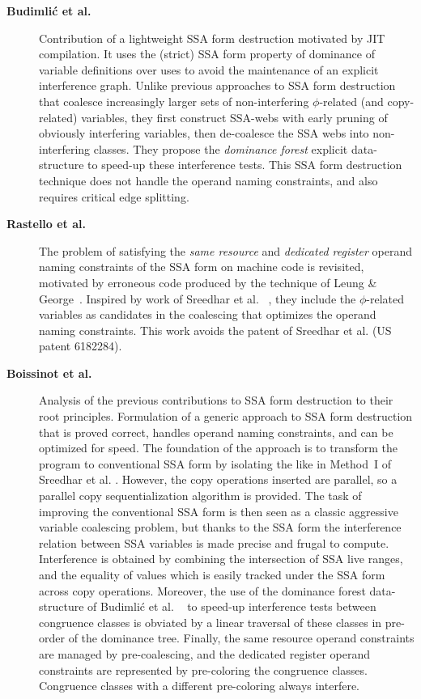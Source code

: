 \begin{description}
\item[\textbf{Budimli\'c et al.~\cite{Budimlic:2002:PLDI}}] Contribution of a lightweight SSA form
destruction motivated by JIT compilation. It uses the (strict) SSA form property
of dominance of variable definitions over uses to avoid the maintenance of an
explicit interference graph. Unlike previous approaches to SSA form destruction
that coalesce increasingly larger sets of non-interfering $\phi$-related (and
copy-related) variables, they first construct SSA-webs with early pruning of
obviously interfering variables, then de-coalesce the SSA webs into
non-interfering classes.  They propose the \emph{dominance forest} explicit
data-structure to speed-up these interference tests. This SSA form destruction
technique does not handle the operand naming constraints, and also requires
critical edge splitting.

\item[\textbf{Rastello et al.~\cite{Rastello:2004:CGO}}] The problem of
satisfying the \emph{same resource} and \emph{dedicated register} operand naming
constraints of the SSA form on machine code is revisited, motivated by erroneous code
produced by the technique of Leung \& George~\cite{Leung:1999:PLDI}. Inspired by
work of Sreedhar et al. ~\cite{Sreedhar:1999:SAS}, they include the
$\phi$-related variables as candidates in the coalescing that optimizes the
operand naming constraints.  This work avoids the patent of Sreedhar et al. (US
patent 6182284).


\item[\textbf{Boissinot et al.~\cite{Boissinot:2009:CGO}}] Analysis of the previous
contributions to SSA form destruction to their root principles. Formulation
of a generic approach to SSA form destruction that is proved correct, handles
operand naming constraints, and can be optimized for speed. The foundation of
the approach is to transform the program to conventional SSA form by isolating
the \phifuns like in Method~I of Sreedhar et al.
\cite{Sreedhar:1999:SAS}.  However, the copy operations inserted are parallel,
so a parallel copy sequentialization algorithm is provided. The task of
improving the conventional SSA form is then seen as a classic aggressive
variable coalescing problem, but thanks to the SSA form the
interference relation between SSA variables is made precise and frugal to
compute.  Interference is obtained by combining the intersection of SSA live
ranges, and the equality of values which is easily tracked under the SSA form
across copy operations. Moreover, the use of the dominance forest data-structure
of Budimli\'c et al. ~\cite{Budimlic:2002:PLDI} to speed-up interference tests
between congruence classes is obviated by a linear traversal of these classes in
pre-order of the dominance tree. Finally, the same resource operand constraints
are managed by pre-coalescing, and the dedicated register operand constraints
are represented by pre-coloring the congruence classes. Congruence classes with
a different pre-coloring always interfere.

\end{description}

